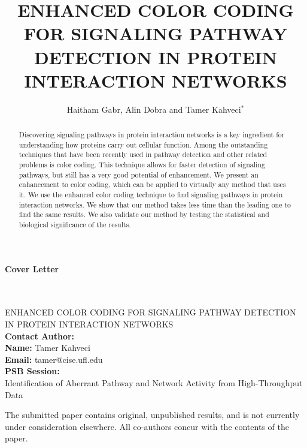 \documentclass{ws-procs11x85}
\begin{document}
\noindent
\centerline{\LARGE \bf Cover Letter}\\

\\
ENHANCED COLOR CODING FOR SIGNALING PATHWAY DETECTION IN PROTEIN
INTERACTION NETWORKS\\

\noindent
{\bf Contact Author:} \\
{\bf Name:} Tamer Kahveci\\
{\bf Email:} tamer@cise.ufl.edu\\

\noindent
{\bf PSB Session:}\\
Identification of Aberrant Pathway and Network Activity from High-Throughput Data

\begin{center}
 The submitted paper contains original, unpublished results, and is
 not currently under consideration elsewhere.  All co-authors concur
 with the contents of the paper.
\end{center}

\pagebreak
\addtocounter{page}{-1}




\title{ENHANCED COLOR CODING FOR SIGNALING PATHWAY DETECTION IN PROTEIN
INTERACTION NETWORKS}

\author{Haitham Gabr, Alin Dobra and Tamer Kahveci$^*$}

\address{CISE Department, University of Florida,\\
Gainesville, FL 32611, USA\\
E-mail: \{hgabr, adobra, tamer$^*$\}@cise.ufl.edu}

\begin{abstract} 
	Discovering signaling pathways in protein interaction networks is a key
	ingredient for understanding how proteins carry out cellular function. Among
	the outstanding techniques that have been recently used in pathway detection and
	other related problems is color coding. This technique allows for faster
	detection of signaling pathways, but still has a very good potential of
	enhancement. We present an enhancement to color coding, which can be applied
	to virtually any method that uses it. We use the enhanced color coding
	technique to find signaling pathways in protein interaction networks. We show
	that our method takes less time than the leading one to find the same results.
	We also validate our method by testing the statistical and biological
	significance of the results.
\end{abstract}
\end{document}
